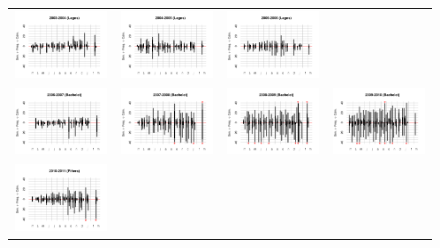 \documentclass[letter,12pt]{article}
\begin{document}
\begin{figure}
\begin{center}
\begin{tabular}{cccc}
    \includegraphics[width=.22\columnwidth]{../graphs/urgenciasHistog2003.pdf} &
    \includegraphics[width=.22\columnwidth]{../graphs/urgenciasHistog2004.pdf} &
    \includegraphics[width=.22\columnwidth]{../graphs/urgenciasHistog2005.pdf} \\
    \includegraphics[width=.22\columnwidth]{../graphs/urgenciasHistog2006.pdf} &
    \includegraphics[width=.22\columnwidth]{../graphs/urgenciasHistog2007.pdf} &
    \includegraphics[width=.22\columnwidth]{../graphs/urgenciasHistog2008.pdf} &
    \includegraphics[width=.22\columnwidth]{../graphs/urgenciasHistog2009.pdf} \\
    \includegraphics[width=.22\columnwidth]{../graphs/urgenciasHistog2010.pdf} &

\end{tabular}
\end{center}
\end{figure}
\end{document}
